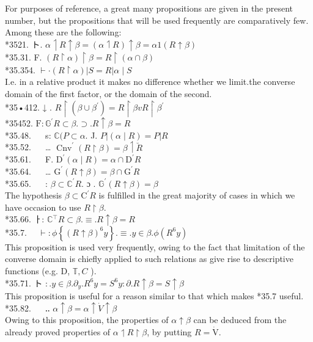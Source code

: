 \documentclass[10pt]{article}
\begin{document}
For purposes of reference, a great many propositions are given in the present number, but the propositions that will be used frequently are comparatively few. Among these are the following:\\
*3521. ト. $\alpha \upharpoonleft R \uparrow \beta=(\alpha \upharpoonleft R) \uparrow \beta=\alpha 1(R \uparrow \beta)$\\
*35.31. F. $(R \upharpoonright \alpha) \upharpoonright \beta=R \upharpoonright(\alpha \cap \beta)$\\
*35.354. $\vdash \cdot(R \upharpoonright \alpha)|S=R| \alpha \mid S$\\
I.e. in a relative product it makes no difference whether we limit.the converse domain of the first factor, or the domain of the second.\\
*35•412. ↓ . $R \upharpoonright\left(\beta \cup \beta^{\prime}\right)=R \upharpoonright \beta v R \upharpoonright \beta^{\prime}$\\
*35452. $\mathrm{F}: \mathbb{G}^{\prime} R \subset \beta . \supset . R \uparrow \beta=R$\\
*35.48. $\quad$ s: $\mathbb{C}(P \subset \alpha$. J. $P|(\alpha \mid R)=P| R$\\
*35.52. $\quad$ … $\operatorname{Cnv}^{\prime}(R \upharpoonright \beta)=\beta \upharpoonleft \breve{R}$\\
*35.61. $\quad$ F. $\mathrm{D}^{\prime}(\alpha \mid R)=\alpha \cap \mathrm{D}^{\prime} R$\\
*35.64. $\quad$ … $\mathrm{G}^{\prime}(R \uparrow \beta)=\beta \cap \mathrm{G}^{\prime} R$\\
*35.65. $\quad$ : $\beta \subset \mathbb{C}^{\prime} R$. ɔ . $\mathbb{G}^{\prime}(R \uparrow \beta)=\beta$\\
The hypothesis $\beta \subset \mathrm{C}^{\prime} R$ is fulfilled in the great majority of cases in which we have occasion to use $R \upharpoonright \beta$.\\
*35.66. ㅏ: $\mathbb{C}{ }^{\top} R \subset \beta . \equiv . R \uparrow \beta=R$\\
*35.7. $\quad \vdash: \phi\left\{(R \uparrow \beta)^{6} y\right\} . \equiv . y \in \beta . \phi\left(R^{6} y\right)$\\
This proposition is used very frequently, owing to the fact that limitation of the converse domain is chiefly applied to such relations as give rise to descriptive functions (e.g. D, $\mathbb{T}, C$ ).\\
*35.71. ト $: . y \in \beta . \partial_{y} . R^{6} y=S^{6} y: \partial . R \uparrow \beta=S \uparrow \beta$\\
This proposition is useful for a reason similar to that which makes *35.7 useful.\\
*35.82. $\quad$ ‥ $\alpha \uparrow \beta=\alpha \uparrow \dot{V} \uparrow \beta$\\
Owing to this proposition, the properties of $\alpha \uparrow \beta$ can be deduced from the already proved properties of $\alpha \upharpoonleft R \upharpoonright \beta$, by putting $R=\dot{\mathrm{V}}$.
\end{document}
